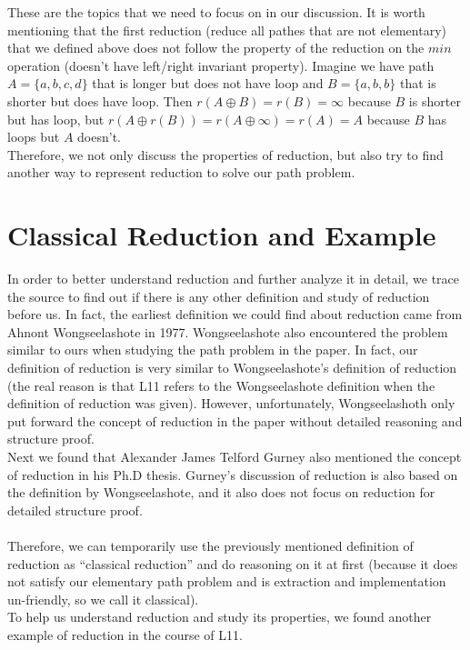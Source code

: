 \documentclass[a4paper,10pt]{article}
\begin{document}
These are the topics that we need to focus on in our discussion.
It is worth mentioning that the first reduction (reduce all pathes that are not elementary) that we defined above does not follow the property of the reduction on the $min$ operation (doesn't have left/right invariant property). Imagine we have path $A = \{a,b,c,d\}$ that is longer but does not have loop and $B = \{a,b,b\}$ that is shorter but does have loop. Then $r(A\oplus B) = r(B) = \infty$ because $B$ is shorter but has loop, but $r(A\oplus r(B)) = r(A \oplus \infty) = r(A) = A$ because $B$ has loops but $A$ doesn't.\\
Therefore, we not only discuss the properties of reduction, but also try to find another way to represent reduction to solve our path problem.
\section{Classical Reduction and Example}
In order to better understand reduction and further analyze it in detail, we trace the source to find out if there is any other definition and study of reduction before us. 
In fact, the earliest definition we could find about reduction came from Ahnont Wongseelashote in 1977\cite{WONGSEELASHOTE197955}. Wongseelashote also encountered the problem similar to ours when studying the path problem in the paper. In fact, our definition of reduction is very similar to Wongseelashote's definition of reduction (the real reason is that L11 refers to the Wongseelashote definition when the definition of reduction was given). However, unfortunately, Wongseelashoth only put forward the concept of reduction in the paper without detailed reasoning and structure proof.\\
Next we found that Alexander James Telford Gurney also mentioned the concept of reduction in his Ph.D thesis\cite{gurney_construction_2010}. Gurney's discussion of reduction is also based on the definition by Wongseelashote, and it also does not focus on reduction for detailed structure proof.\\\\
Therefore, we can temporarily use the previously mentioned definition of reduction as “classical reduction” and do reasoning on it at first (because it does not satisfy our elementary path problem and is extraction and implementation un-friendly, so we call it classical).\\
To help us understand reduction and study its properties, we found another example of reduction in the course of L11.\\\\
\end{document}
